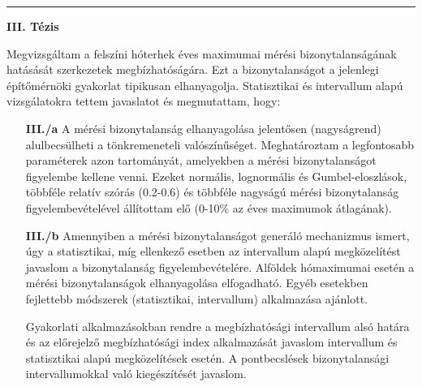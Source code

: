 \begin{otherlanguage}{hungarian}
\begin{center}
	\noindent\rule[0.5ex]{0.5\linewidth}{0.5pt}
	\item[\textbf{III. Tézis}] \hfill
\end{center}
Megvizsgáltam a felszíni hóterhek éves maximumai mérési bizonytalanságának hatásását szerkezetek megbízhatóságára. Ezt a bizonytalanságot a jelenlegi építőmérnöki gyakorlat tipikusan elhanyagolja. Statisztikai és intervallum alapú vizsgálatokra tettem javaslatot és megmutattam, hogy:
\begin{enumerate}[leftmargin=*, align=left, labelwidth=*]
	\item[\textbf{III./a}] A mérési bizonytalanság elhanyagolása jelentősen (nagyságrend) alulbecsülheti a tönkremeneteli valószínűséget. Meghatároztam a legfontosabb paraméterek azon tartományát, amelyekben a mérési bizonytalanságot figyelembe kellene venni. Ezeket normális, lognormális és Gumbel-eloszlások, többféle relatív szórás (0.2-0.6) és többféle nagyságú mérési bizonytalanság figyelembevételével állítottam elő (0-10\% az éves maximumok átlagának).
	
	\item[\textbf{III./b}] Amennyiben a mérési bizonytalanságot generáló mechanizmus ismert, úgy a statisztikai, míg ellenkező esetben az intervallum alapú megközelítést javaslom a bizonytalanság figyelembevételére. Alföldek hómaximumai esetén a mérési bizonytalanságok elhanyagolása elfogadható. Egyéb esetekben fejlettebb módszerek (statisztikai, intervallum) alkalmazása ajánlott.
	
	Gyakorlati alkalmazásokban rendre a megbízhatósági intervallum alsó határa és az előrejelző megbízhatósági index alkalmazását javaslom intervallum és statisztikai alapú megközelítések esetén. A pontbecslések bizonytalansági intervallumokkal való kiegészítését javaslom.
\end{enumerate}

  
\citep{RozsasREC2016snow}



\end{otherlanguage}
